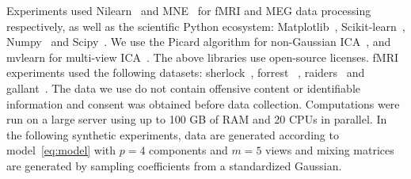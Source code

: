 Experiments used Nilearn~\cite{abraham2014machine} and MNE~\cite{gramfort2013meg} for fMRI and MEG data
processing respectively, as well as the scientific Python ecosystem:
Matplotlib~\cite{hunter2007matplotlib}, Scikit-learn~\cite{pedregosa2011scikit},
Numpy~\cite{harris2020array} and Scipy~\cite{2020SciPy-NMeth}. We use the Picard algorithm for non-Gaussian ICA~\cite{ablin2018faster}, and mvlearn for multi-view ICA~\cite{perry2020mvlearn}. The above libraries use open-source licenses. fMRI experiments used the following datasets: sherlock~\cite{chen2017shared}, forrest~\cite{hanke2014high} , raiders~\cite{ibc} and gallant~\cite{ibc}. The data we use do not contain offensive content or identifiable information and consent was obtained before data collection. Computations were run on a large server using up to 100 GB of RAM and 20 CPUs in parallel.
%
In the following synthetic experiments, data are generated according to model~\eqref{eq:model} with $p=4$ components and $m=5$ views and mixing matrices are generated by sampling coefficients from a standardized Gaussian.
